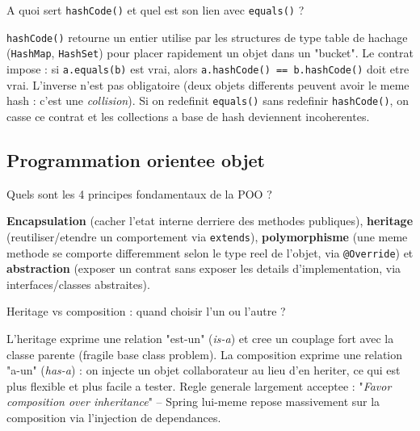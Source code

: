 \documentclass[11pt,a4paper]{article}
\begin{document}
\begin{question} A quoi sert \texttt{hashCode()} et quel est son lien avec \texttt{equals()} ?
\end{question}
\begin{reponse}
\texttt{hashCode()} retourne un entier utilise par les structures de type table de hachage (\texttt{HashMap}, \texttt{HashSet}) pour placer rapidement un objet dans un "bucket". Le contrat impose : si \texttt{a.equals(b)} est vrai, alors \texttt{a.hashCode() == b.hashCode()} doit etre vrai. L'inverse n'est pas obligatoire (deux objets differents peuvent avoir le meme hash : c'est une \emph{collision}). Si on redefinit \texttt{equals()} sans redefinir \texttt{hashCode()}, on casse ce contrat et les collections a base de hash deviennent incoherentes.
\end{reponse}

\subsection{Programmation orientee objet}

\begin{question} Quels sont les 4 principes fondamentaux de la POO ?
\end{question}
\begin{reponse}
\textbf{Encapsulation} (cacher l'etat interne derriere des methodes publiques), \textbf{heritage} (reutiliser/etendre un comportement via \texttt{extends}), \textbf{polymorphisme} (une meme methode se comporte differemment selon le type reel de l'objet, via \texttt{@Override}) et \textbf{abstraction} (exposer un contrat sans exposer les details d'implementation, via interfaces/classes abstraites).
\end{reponse}

\begin{question} Heritage vs composition : quand choisir l'un ou l'autre ?
\end{question}
\begin{reponse}
L'heritage exprime une relation "est-un" (\emph{is-a}) et cree un couplage fort avec la classe parente (fragile base class problem). La composition exprime une relation "a-un" (\emph{has-a}) : on injecte un objet collaborateur au lieu d'en heriter, ce qui est plus flexible et plus facile a tester. Regle generale largement acceptee : "\emph{Favor composition over inheritance}" -- Spring lui-meme repose massivement sur la composition via l'injection de dependances.
\end{reponse}
\end{document}
